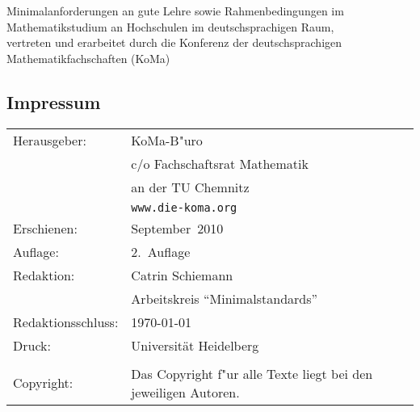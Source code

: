 \newpage
\vspace*{5cm}

\begin{center}
	Minimalanforderungen an gute Lehre sowie Rahmenbedingungen im Mathematikstudium
	an Hochschulen im deutschsprachigen Raum,\\
	vertreten und erarbeitet durch die Konferenz der deutschsprachigen Mathematikfachschaften (KoMa)
\end{center}

\vfill
\subsection*{Impressum}

\begin{table}[h]
\footnotesize
		\begin{tabular}{ll}
		Herausgeber:				& KoMa-B"uro \\
									& c/o Fachschaftsrat Mathematik \\
									& an der TU Chemnitz \\
									& \texttt{www.die-koma.org} \\
		Erschienen:					& September~2010 \\
		Auflage:					& 2.~Auflage\\
		Redaktion:					& Catrin Schiemann \\
									& Arbeitskreis "`Minimalstandards"'\\ 
		Redaktionsschluss:			& \today \\
		Druck:						& Universität Heidelberg \\
												& \\
		Copyright:					& Das Copyright f"ur alle Texte liegt bei den jeweiligen Autoren. \\
		\end{tabular}
\end{table}